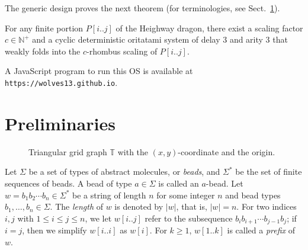 \documentclass[runningheads]{llncs}
\begin{document}
The generic design proves the next theorem (for terminologies, see Sect.~\ref{sect:preliminaries}). 

\begin{theorem}\label{thm:main}
	For any finite portion $P[i..j]$ of the Heighway dragon, there exist a scaling factor $c \in \mathbb{N}^+$ and a cyclic deterministic oritatami system of delay 3 and arity 3 that weakly folds into the $c$-rhombus scaling of $P[i..j]$. 
\end{theorem}

\noindent
A JavaScript program to run this OS is available at {\small {\tt https://wolves13.github.io}}. 

	\section{Preliminaries}
	\label{sect:preliminaries}

\begin{figure}
\vspace*{-7mm}
\caption{Triangular grid graph $\mathbb{T}$ with the $(x, y)$-coordinate and the origin.}
\label{fig:triangular_grid}
\end{figure}

Let $\Sigma$ be a set of types of abstract molecules, or \textit{beads}, and $\Sigma^*$ be the set of finite sequences of beads. 
A bead of type $a \in \Sigma$ is called an $a$-bead. 
Let $w = b_1 b_2\cdots b_n \in \Sigma^*$ be a string of length $n$ for some integer $n$ and bead types $b_1, \ldots, b_n \in \Sigma$.
The \textit{length} of $w$ is denoted by $|w|$, that is, $|w| = n$. 
For two indices $i,j$ with $1\leq i \leq j \leq n$, we let $w[i..j]$ refer to the subsequence $b_i b_{i+1} \cdots b_{j-1} b_{j}$; if $i=j$, then we simplify $w[i..i]$ as $w[i]$.
For $k \ge 1$, $w[1..k]$ is called a \textit{prefix} of $w$. 
\end{document}
